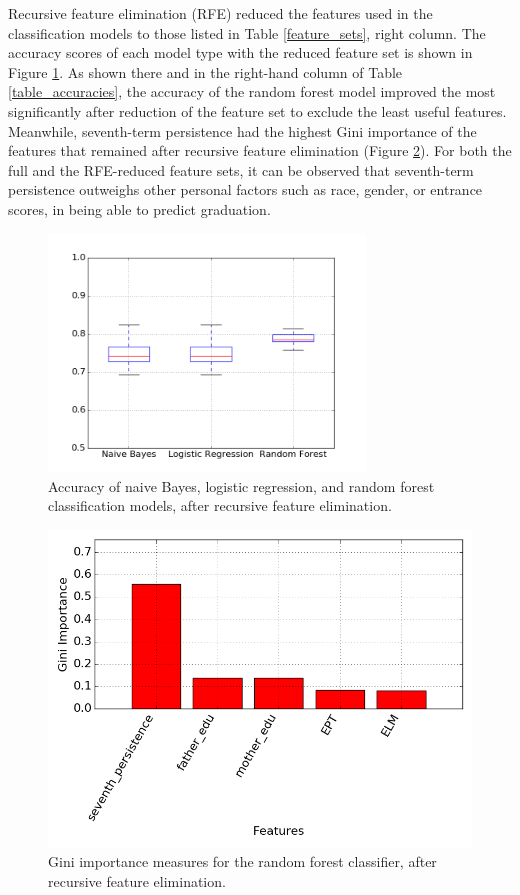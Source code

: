 Recursive feature elimination (RFE) reduced the features used in the classification models to those listed in Table \ref{feature_sets}, right column.  The accuracy scores of each model type with the reduced feature set is shown in Figure \ref{accuracies_reduced}.  As shown there and in the right-hand column of Table \ref{table_accuracies}, the accuracy of the random forest model improved the most significantly after reduction of the feature set to exclude the least useful features.  Meanwhile,  seventh-term persistence had the highest Gini importance of the features that remained after recursive feature elimination (Figure \ref{importances_reduced}).  For both the full and the RFE-reduced feature sets, it can be observed that seventh-term persistence outweighs other personal factors such as race, gender, or entrance scores, in being able to predict graduation.    

\begin{figure}[htbp]
\centering
\includegraphics[width=0.75\textwidth]{figures/accuracies_reduced.png}
\caption{Accuracy of naive Bayes, logistic regression, and random forest classification models, after recursive feature elimination.}
\label{accuracies_reduced}
\end{figure}

\begin{figure}[htbp]
\centering
\includegraphics[width=\textwidth]{figures/importances_reduced.png}
\caption{Gini importance measures for the random forest classifier, after recursive feature elimination.}
\label{importances_reduced}
\end{figure}


